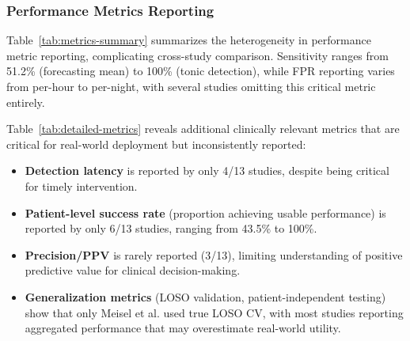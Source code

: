 \subsubsection{Performance Metrics Reporting}
Table~\ref{tab:metrics-summary} summarizes the heterogeneity in performance metric reporting, complicating cross-study comparison. Sensitivity ranges from 51.2\% (forecasting mean) to 100\% (tonic detection), while FPR reporting varies from per-hour to per-night, with several studies omitting this critical metric entirely.

Table~\ref{tab:detailed-metrics} reveals additional clinically relevant metrics that are critical for real-world deployment but inconsistently reported:
\begin{itemize}
  \item \textbf{Detection latency} is reported by only 4/13 studies, despite being critical for timely intervention.
  \item \textbf{Patient-level success rate} (proportion achieving usable performance) is reported by only 6/13 studies, ranging from 43.5\% to 100\%.
  \item \textbf{Precision/PPV} is rarely reported (3/13), limiting understanding of positive predictive value for clinical decision-making.
  \item \textbf{Generalization metrics} (LOSO validation, patient-independent testing) show that only Meisel et al. used true LOSO CV, with most studies reporting aggregated performance that may overestimate real-world utility.
\end{itemize}

\begin{table}[htbp]
\centering
\small
\caption{Performance Metrics Reporting Across Studies}
\label{tab:metrics-summary}
\end{table}

